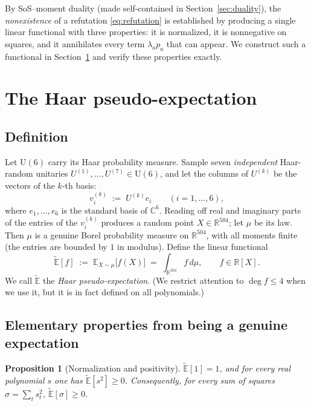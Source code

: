 \documentclass{amsart}
\newtheorem{proposition}{Proposition}
\theoremstyle{definition}
\begin{document}
By SoS--moment duality (made self-contained in Section~\ref{sec:duality}), the
\emph{nonexistence} of a refutation \eqref{eq:refutation} is established by producing a single
linear functional with three properties: it is normalized, it is nonnegative on squares, and it
annihilates every term $\lambda_a p_a$ that can appear. We construct such a functional in
Section~\ref{sec:pe} and verify these properties exactly.

\section{The Haar pseudo-expectation}\label{sec:pe}

\subsection{Definition}
Let $\mathrm{U}(6)$ carry its Haar probability measure. Sample seven \emph{independent}
Haar-random unitaries $U^{(1)},\dots,U^{(7)}\in\mathrm{U}(6)$, and let the columns of $U^{(k)}$
be the vectors of the $k$-th basis:
\begin{equation}\label{eq:sampling}
v^{(k)}_i \;:=\; U^{(k)} e_i\qquad(i=1,\dots,6),
\end{equation}
where $e_1,\dots,e_6$ is the standard basis of $\mathbb{C}^6$. Reading off real and imaginary
parts of the entries of the $v^{(k)}_i$ produces a random point $X\in\mathbb{R}^{504}$; let
$\mu$ be its law. Then $\mu$ is a genuine Borel probability measure on $\mathbb{R}^{504}$, with
all moments finite (the entries are bounded by $1$ in modulus). Define the linear functional
\begin{equation}\label{eq:Edef}
\widetilde{\mathbb{E}}[f]\;:=\;\mathbb{E}_{X\sim\mu}\bigl[f(X)\bigr]\;=\;\int_{\mathbb{R}^{504}} f\,d\mu ,
\qquad f\in\mathbb{R}[X].
\end{equation}
We call $\widetilde{\mathbb{E}}$ the \emph{Haar pseudo-expectation}. (We restrict attention to
$\deg f\le 4$ when we use it, but it is in fact defined on all polynomials.)

\subsection{Elementary properties from being a genuine expectation}

\begin{proposition}[Normalization and positivity]\label{prop:posnorm}
$\widetilde{\mathbb{E}}[1]=1$, and for every real polynomial $s$ one has
$\widetilde{\mathbb{E}}[s^2]\ge 0$. Consequently, for every sum of squares
$\sigma=\sum_t s_t^2$, $\widetilde{\mathbb{E}}[\sigma]\ge 0$.
\end{proposition}
\end{document}
